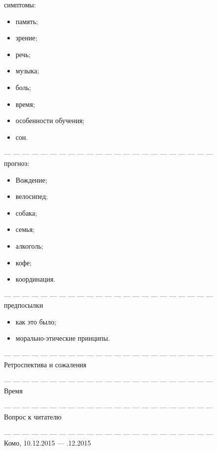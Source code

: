 \documentclass[12pt,a4paper,fullpage]{article}
\begin{document}
симптомы:

\begin{itemize}
	\item память;
	\item зрение;
	\item речь;
	\item музыка;
	\item боль;
	\item время;
	\item особенности обучения;
	\item сон.
\end{itemize}


--- --- --- --- --- --- --- --- --- --- --- --- --- --- --- --- --- --- --- --- --- --- ---\\
прогноз:

\begin{itemize}
	\item Вождение;
	\item велосипед;
	\item собака;
	\item семья;
	\item алкоголь;
	\item кофе;
	\item координация.
\end{itemize}

--- --- --- --- --- --- --- --- --- --- --- --- --- --- --- --- --- --- --- --- --- --- ---\\
предпосылки 

\begin{itemize}
	\item как это было;	
	\item морально-этические принципы.
\end{itemize}



--- --- --- --- --- --- --- --- --- --- --- --- --- --- --- --- --- --- --- --- --- --- ---\\
Ретроспектива и сожаления

--- --- --- --- --- --- --- --- --- --- --- --- --- --- --- --- --- --- --- --- --- --- ---\\
Время

--- --- --- --- --- --- --- --- --- --- --- --- --- --- --- --- --- --- --- --- --- --- ---\\
Вопрос к читателю

--- --- --- --- --- --- --- --- --- --- --- --- --- --- --- --- --- --- --- --- --- --- ---\\

\hfill Комо, 10.12.2015 --- .12.2015
\end{document}

